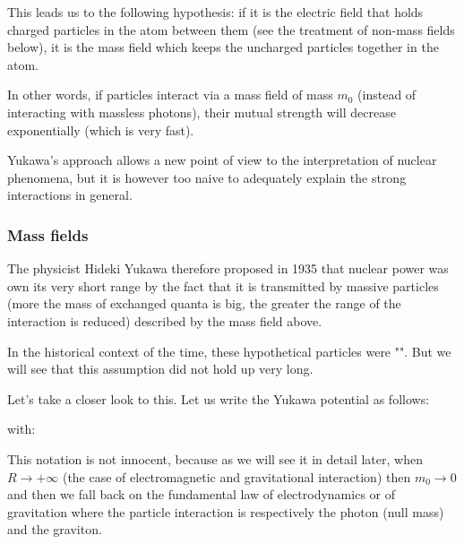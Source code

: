 	This leads us to the following hypothesis: if it is the electric field that holds charged particles in the atom between them (see the treatment of non-mass fields below), it is the mass field which keeps the uncharged particles together in the atom.

	In other words, if particles interact via a mass field of mass $m_0$ (instead of interacting with massless photons), their mutual strength will decrease exponentially (which is very fast).

	Yukawa's approach allows a new point of view to the interpretation of nuclear phenomena, but it is however too naive to adequately explain the strong interactions in general.
	
	\pagebreak
	\subsubsection{Mass fields}
	The physicist Hideki Yukawa therefore proposed in 1935 that nuclear power was own its very short range by the fact that it is transmitted by massive particles (more the mass of exchanged quanta is big, the greater the range of the interaction is reduced) described by the mass field above.
	
	\begin{tcolorbox}[title=Remark,colframe=black,arc=10pt]
	In the historical context of the time, these hypothetical particles were "". But we will see that this assumption did not hold up very long.
	\end{tcolorbox}
	Let's take a closer look to this. Let us write the Yukawa potential as follows:
	
	with:
	
	This notation is not innocent, because as we will see it in detail later, when $R\rightarrow +\infty$ (the case of electromagnetic and gravitational interaction) then $m_0\rightarrow 0$ and then we fall back on the fundamental law of electrodynamics or of gravitation where the particle interaction is respectively the photon (null mass) and the graviton.
	
